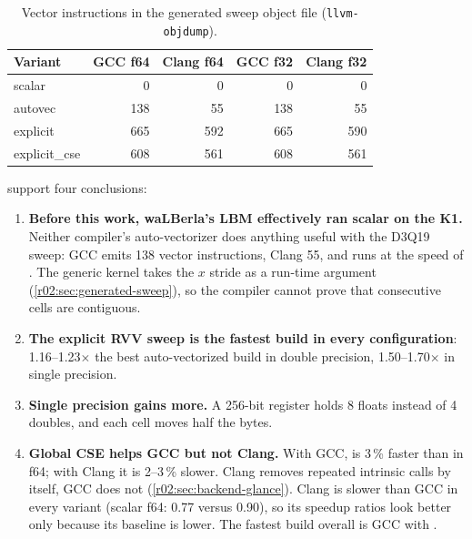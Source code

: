 \begin{table}[htbp]
  \centering\small
  \caption{Vector instructions in the generated sweep object file (\texttt{llvm-objdump}).}\label{r02:tab:insns}
  \begin{tabular}{@{}lrrrr@{}}
    \toprule
    \textbf{Variant} & \textbf{GCC f64} & \textbf{Clang f64} & \textbf{GCC f32} & \textbf{Clang f32}\\
    \midrule
    scalar        & 0   & 0   & 0   & 0\\
    autovec       & 138 & 55  & 138 & 55\\
    explicit      & 665 & 592 & 665 & 590\\
    explicit\_cse & 608 & 561 & 608 & 561\\
    \bottomrule
  \end{tabular}
\end{table}

 support four conclusions:
\begin{enumerate}
  \item \textbf{Before this work, waLBerla's LBM effectively ran scalar on the K1.}
        Neither compiler's auto-vectorizer does anything useful with the D3Q19 sweep:
        GCC emits 138 vector instructions, Clang 55, and  runs at the
        speed of . The generic kernel takes the $x$ stride as a run-time
        argument (\cref{r02:sec:generated-sweep}), so the compiler cannot prove that
        consecutive cells are contiguous.
  \item \textbf{The explicit RVV sweep is the fastest build in every configuration}:
        1.16--1.23$\times$ the best auto-vectorized build in double precision,
        1.50--1.70$\times$ in single precision.
  \item \textbf{Single precision gains more.} A 256-bit register holds 8 floats instead
        of 4 doubles, and each cell moves half the bytes.
  \item \textbf{Global CSE helps GCC but not Clang.} With GCC,  is
        3\,\% faster than  in f64; with Clang it is 2--3\,\% slower.
        Clang removes repeated intrinsic calls by itself, GCC does not
        (\cref{r02:sec:backend-glance}). Clang is slower than GCC in every variant
        (scalar f64: 0.77 versus 0.90), so its speedup ratios look better only because
        its baseline is lower. The fastest build overall is GCC with .
\end{enumerate}

